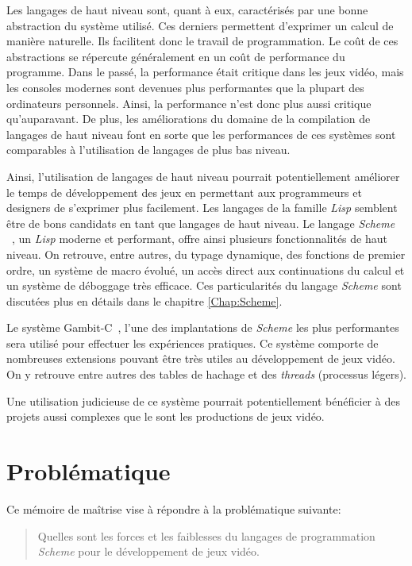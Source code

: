 \documentclass[12pt,twoside,letterpaper,francais]{book}
\newcommand{\lisp}{{\textit{Lisp }}}
\newcommand{\Schemelang}{{\textit{Scheme }}}
\begin{document}
Les langages de haut niveau sont, quant à eux, caractérisés par une
bonne abstraction du système utilisé. Ces derniers permettent
d'exprimer un calcul de manière naturelle. Ils facilitent donc le
travail de programmation. Le coût de ces abstractions se répercute
généralement en un coût de performance du programme. Dans le passé, la
performance était critique dans les jeux vidéo, mais les consoles
modernes sont devenues plus performantes que la plupart des
ordinateurs personnels. Ainsi, la performance n'est donc plus aussi
critique qu'auparavant. De plus, les améliorations du domaine de la
compilation de langages de haut niveau font en sorte que les
performances de ces systèmes sont comparables à l'utilisation de
langages de plus bas niveau.

Ainsi, l'utilisation de langages de haut niveau pourrait
potentiellement améliorer le temps de développement des jeux en
permettant aux programmeurs et designers de s'exprimer plus
facilement. Les langages de la famille \lisp semblent être de bons
candidats en tant que langages de haut niveau. Le langage
\Schemelang~\cite{R5RS}, un \lisp moderne et performant, offre ainsi
plusieurs fonctionnalités de haut niveau. On retrouve, entre autres,
du typage dynamique, des fonctions de premier ordre, un système de
macro évolué, un accès direct aux continuations du calcul et un
système de déboggage très efficace. Ces particularités du langage
\Schemelang sont discutées plus en détails dans le chapitre
\ref{Chap:Scheme}.

Le système Gambit-C~\cite{Gambit4}, l'une des implantations de
\Schemelang les plus performantes~\cite{GAMBIT_BENCHMARKS} sera
utilisé pour effectuer les expériences pratiques. Ce système comporte
de nombreuses extensions pouvant être très utiles au développement de
jeux vidéo. On y retrouve entre autres des tables de hachage et des
\textit{threads} (processus légers).

Une utilisation judicieuse de ce système pourrait potentiellement
bénéficier à des projets aussi complexes que le sont les productions
de jeux vidéo.

\FloatBarrier
\section{Problématique}
Ce mémoire de maîtrise vise à répondre à la problématique suivante:
\begin{quote}
  Quelles sont les forces et les faiblesses du langages de
  programmation \Schemelang pour le développement de jeux vidéo.
\end{quote}
\end{document}
